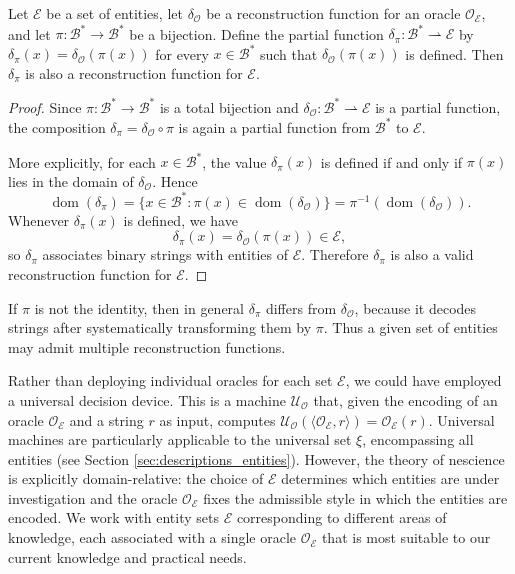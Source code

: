 \begin{proposition}
\label{prop:reconstruction_bijection}
Let $\mathcal{E}$ be a set of entities, let $\delta_\mathcal{O}$ be a reconstruction function for an oracle $\mathcal{O}_\mathcal{E}$, and let $\pi : \mathcal{B}^\ast \to \mathcal{B}^\ast$ be a bijection. Define the partial function $\delta_\pi : \mathcal{B}^\ast \rightharpoonup \mathcal{E}$ by $\delta_\pi(x)=\delta_\mathcal{O}(\pi(x))$ for every $x \in \mathcal{B}^\ast$ such that $\delta_\mathcal{O}(\pi(x))$ is defined. Then $\delta_\pi$ is also a reconstruction function for $\mathcal{E}$.
\end{proposition}
\begin{proof}
Since $\pi : \mathcal{B}^\ast \to \mathcal{B}^\ast$ is a total bijection and $\delta_\mathcal{O} : \mathcal{B}^\ast \rightharpoonup \mathcal{E}$ is a partial function, the composition $\delta_\pi = \delta_\mathcal{O} \circ \pi$ is again a partial function from $\mathcal{B}^\ast$ to $\mathcal{E}$.

More explicitly, for each $x \in \mathcal{B}^\ast$, the value $\delta_\pi(x)$ is defined if and only if $\pi(x)$ lies in the domain of $\delta_\mathcal{O}$. Hence
\[
\operatorname{dom}(\delta_\pi) = \{x \in \mathcal{B}^\ast : \pi(x)\in\operatorname{dom}(\delta_\mathcal{O})\} = \pi^{-1}(\operatorname{dom}(\delta_\mathcal{O})).
\]
Whenever $\delta_\pi(x)$ is defined, we have
\[
\delta_\pi(x)=\delta_\mathcal{O}(\pi(x))\in\mathcal{E},
\]
so \(\delta_\pi\) associates binary strings with entities of \(\mathcal{E}\). Therefore \(\delta_\pi\) is also a valid reconstruction function for \(\mathcal{E}\).
\end{proof}

If $\pi$ is not the identity, then in general $\delta_\pi$ differs from $\delta_\mathcal{O}$, because it decodes strings after systematically transforming them by $\pi$. Thus a given set of entities may admit multiple reconstruction functions.

Rather than deploying individual oracles for each set $\mathcal{E}$, we could have employed a universal decision device. This is a machine $\mathcal{U}_\mathcal{O}$ that, given the encoding of an oracle $\mathcal{O}_\mathcal{E}$ and a string $r$ as input, computes $\mathcal{U}_\mathcal{O} \left( \langle \mathcal{O}_\mathcal{E}, r \rangle \right) = \mathcal{O}_\mathcal{E} \left( r \right)$. Universal machines are particularly applicable to the universal set $\xi$, encompassing all entities (see Section \ref{sec:descriptions_entities}). However, the theory of nescience is explicitly domain-relative: the choice of $\mathcal{E}$ determines which entities are under investigation and the oracle $\mathcal{O}_\mathcal{E}$ fixes the admissible style in which the entities are encoded. We work with entity sets $\mathcal{E}$ corresponding to different areas of knowledge, each associated with a single oracle $\mathcal{O}_\mathcal{E}$ that is most suitable to our current knowledge and practical needs.

